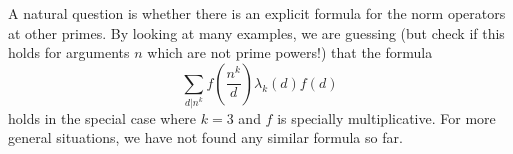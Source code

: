 \begin{remark}
A natural question is whether there is an explicit formula for the norm operators at other primes. By looking at many examples, we are guessing (but check if this holds for arguments $n$ which are not prime powers!) that the formula 
$$ \sum_{d \vert n^k} f(\frac{n^k}{d}) \lambda_k(d) f(d)  $$
holds in the special case where $k=3$ and $f$ is specially multiplicative. For more general situations, we have not found any similar formula so far. 
\end{remark}



\newpage







